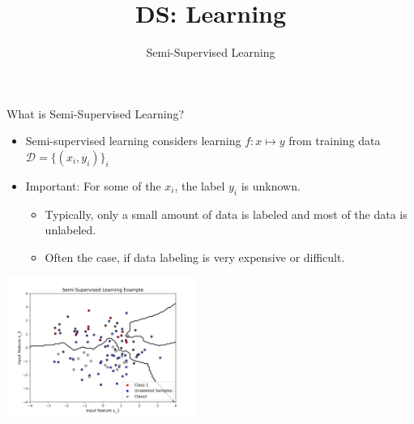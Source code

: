 \documentclass[aspectratio=169]{../latex_main/tntbeamer}  %
\title[Semi-Supervised Learning]{DS: Learning}
\subtitle{Semi-Supervised Learning}
\begin{document}
	
    \maketitle
    
    \begin{frame}[c]{What is Semi-Supervised Learning?}
        \begin{itemize}
            \item Semi-supervised learning considers learning $f: x \mapsto y$ from training data $\mathcal{D}= \{(x_i,y_i)\}_{i}$ 
            \item \alert{Important:} For some of the $x_i$, the label $y_i$ is unknown.
            \begin{itemize}
                \item Typically, only a small amount of data is labeled and most of the data is unlabeled.
                \item Often the case, if data labeling is very expensive or difficult.
            \end{itemize}
        \end{itemize} 

        \centering
        \includegraphics[width=0.46\textwidth]{figure/semi-supervised}

    
    
    
    
    

\end{frame}
\end{document}
